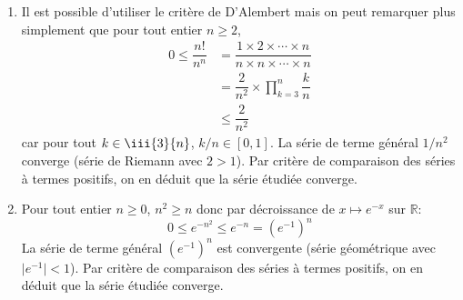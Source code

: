\documentclass[a4paper,twoside,french,10pt]{VcCours}
\begin{document}
\begin{enumerate}
%
\item Il est possible d'utiliser le critère de D'Alembert mais on peut remarquer plus simplement que pour tout entier $n \geq 2$,
\begin{align*}
 0 \leq \dfrac{n!}{n^n} & = \dfrac{1 \times 2 \times \cdots \times n}{n \times n \times \cdots \times n} \\
 & = \dfrac{2}{n^2} \times \prod_{k=3}^n \dfrac{k}{n} \\
 & \leq \dfrac{2}{n^2}
 \end{align*}
car pour tout $k \in \iii{3}{n}$, $k/n \in [0,1]$. La série de terme général $1/n^2$ converge (série de Riemann avec $2>1$). Par critère de comparaison des séries à termes positifs, on en déduit que la série étudiée converge.
\item Pour tout entier $n \geq 0$, $n^2 \geq n$ donc par décroissance de $x \mapsto e^{-x}$ sur $\mathbb{R}$:
$$ 0 \leq e^{-n^2} \leq e^{-n} = (e^{-1})^n$$
La série de terme général $(e^{-1})^n$ est convergente (série géométrique avec $\vert e^{-1}\vert <1$). Par critère de comparaison des séries à termes positifs, on en déduit que la série étudiée converge.

\medskip


\end{enumerate}
\end{document}
